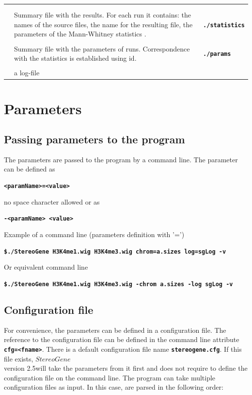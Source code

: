 \documentclass{article}
\newcommand{\prm}[1]{\texttt{\textbf{{#1}}}}
\newcommand{\sg}{$StereoGene$\\ version 2.5}
\newcounter{rowc}
\newcommand{\cw}{3.5cm}
\newcommand{\rc}[1]
 {\ifthenelse{\isodd{\value{rowc}}}
 {\\ \rowcolor{ltgray} }
 {\\}
 \begin{minipage}{\cw}\prm{#1}\end{minipage}
\stepcounter{rowc}
}
\begin{document}
\begin{longtable}{p{5cm}p{8cm}p{3cm}}
\rc{statistics}	&
	Summary file with the results. For each run it contains: the names of the source files, the name
	 for the resulting file, the parameters of the Mann-Whitney statistics .
	 & \prm{./statistics}
\rc{parameters}	&
	Summary file with the parameters of runs. Correspondence with the statistics  is established using id.
	& \prm{./params}
\rc{log} &
	a log-file &\\\hline
\end{longtable}

\section{Parameters}

\subsection{Passing parameters to the program}
The parameters are passed to the program by a command line. The parameter can be defined as 
\begin{center}
\prm{<paramName>=<value>}
\end{center}
no space character allowed or as
\begin{center}
\prm{-<paramName> <value>}
\end{center}
Example of a command line (parameters definition with '=')
\begin{center}
\prm{\$./StereoGene H3K4me1.wig H3K4me3.wig chrom=a.sizes log=sgLog -v}
\end{center}
Or equivalent command line
\begin{center}
\prm{\$./StereoGene H3K4me1.wig H3K4me3.wig -chrom a.sizes -log sgLog -v}
\end{center}


\subsection{Configuration file}\label{cfg}
For convenience, the parameters can be defined in a configuration file.  The reference to the configuration file can be defined in the command line attribute \prm{cfg=<fname>}. There is a default configuration file name \prm{stereogene.cfg}. If this file exists, \sg will take the parameters from it first and does not require to define the configuration file on the command line. The program can take multiple configuration files as input. In this case,  are parsed in the following order:
\end{document}

